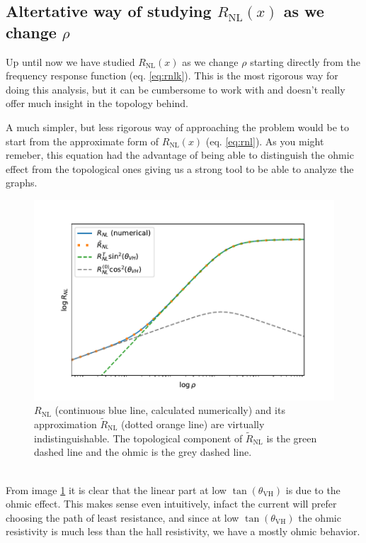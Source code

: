 \subsection{Altertative way of studying $R_{\textrm{NL}}(x)$ as we change $\rho$}
\label{sec:alternaterho}
Up until now we have studied $R_{\textrm{NL}}(x)$ as we change $\rho$ starting directly from the frequency response function (eq. \ref{eq:rnlk}). This is the most rigorous way for doing this analysis, but it can be cumbersome to work with and doesn't really offer much insight in the topology behind.

A much simpler, but less rigorous way of approaching the problem would be to start from the approximate form of $R_{\textrm{NL}}(x)$ (eq. \ref{eq:rnl}). As you might remeber, this equation had the advantage of being able to distinguish the ohmic effect from the topological ones giving us a strong tool to be able to analyze the graphs.
\begin{figure}[h!]
    \centering
    \includegraphics[width=\linewidth]{Immagini/rnl/two_approx_rho.pdf}
    \caption{$R_{\textrm{NL}}$ (continuous blue line, calculated numerically) and its approximation $\tilde R_{\textrm{NL}}$ (dotted orange line) are virtually indistinguishable. The topological component of $\tilde R_{\textrm{NL}}$ is the green dashed line and the ohmic is the grey dashed line.}
    \label{fig:two_approx_rho}
\end{figure}\\

From image \ref{fig:two_approx_rho} it is clear that the linear part at low $\tan(\theta_{\textrm{VH}})$ is due to the ohmic effect. This makes sense even intuitively, infact the current will prefer choosing the path of least resistance, and since at low $\tan(\theta_{\textrm{VH}})$ the ohmic resistivity is much less than the hall resistivity, we have a mostly ohmic behavior.

